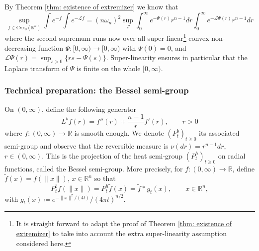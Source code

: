 \documentclass[11pt]{article}
\newcommand{\1}{[1]}
\begin{document}

By Theorem \ref{thm: existence of extremizer}
we know that
$$
    \sup_{f\in \mathrm{Cvx}_0(\mathbb{R}^{n})} 
    \int e^{-f}\int e^{-\mathcal{L}f}
    =
    (n\omega_{n})^2 
    \sup_{\Psi} 
    \int_0^\infty e^{-\Psi(r)}r^{n-1}dr 
    \int_0^\infty e^{-\mathcal{L}\Psi(r)}r^{n-1}dr
$$
where the second supremum runs now over all super-linear\footnote{It is straight forward to adapt the proof of  Theorem \ref{thm: existence of extremizer} to take into account the extra super-linearity assumption considered here.}  convex non-decreasing function $\Psi \colon [0,\infty) \to [0,\infty)$ with $\Psi(0)=0$, and 
$\mathcal{L}\Psi(r)=\sup_{s>0}\{rs-\Psi(s)\}$. 
Super-linearity ensures in particular that the Laplace transform of $\Psi$ is finite on the whole $[0,\infty)$.




\subsubsection*{Technical preparation: the Bessel semi-group}

On $(0,\infty)$, define the following generator
$$
L^bf(r)=f''(r) +\frac{n-1}{r}f'(r), \qquad r>0
$$
where $f \colon (0,\infty) \to \mathbb{R}$ is smooth enough. We denote $(P_t^b)_{t \geq 0}$
its associated semi-group and observe that the reversible measure is $\nu(dr)=r^{n-1}dr$, $r \in (0,\infty)$. 
This is the projection of the heat semi-group $(P_t^h)_{t \geq 0}$ on radial functions, called the Bessel semi-group. More precisely, for $f \colon (0,\infty) \to \mathbb{R}$, define $\tilde{f}(x)=f(\|x\|)$, $x \in \mathbb{R}^n$ so that
$$
P_t^bf(\|x\|) = P_t^h \tilde f(x) = \tilde f* g_t(x), \qquad x \in \mathbb{R}^n ,
$$ 
with $g_t(x)\coloneqq e^{-\|x\|^2/(4t)}/(4\pi t)^{n/2}$.

\end{document}

